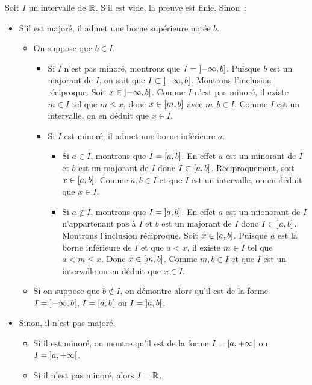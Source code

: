 \documentclass{magnoliaold}
\begin{document}
\begin{preuve}
Soit $I$ un intervalle de $\mathbb{R}$. S'il est vide, la preuve est finie. Sinon~:
\begin{itemize}
\item S'il est majoré, il admet une borne supérieure notée $b$.
  \begin{itemize}
  \item On suppose que $b\in I$.
    \begin{itemize}
    \item Si $I$ n'est pas minoré, montrons que $I=\left]-\infty,b\right]$.
      Puisque $b$ est un majorant de $I$, on sait que
      $I\subset\left]-\infty,b\right]$. Montrons l'inclusion réciproque. Soit
      $x\in\left]-\infty,b\right]$. Comme $I$ n'est pas minoré, il existe
      $m\in I$ tel que $m\leq x$, donc $x\in\left[m,b\right]$ avec $m,b\in I$.
      Comme $I$ est un intervalle, on en déduit que $x\in I$.
    \item Si $I$ est minoré, il admet une borne inférieure $a$.
      \begin{itemize}
      \item Si $a\in I$, montrons que $I=\left[a,b\right]$. En effet $a$ est un
        minorant de $I$ et $b$ est un majorant de $I$ donc
        $I\subset\left[a,b\right]$. Réciproquement, soit $x\in\left[a,b\right]$.
        Comme $a,b\in I$ et que $I$ est un intervalle, on en déduit que
        $x\in I$.
      \item Si $a\not\in I$, montrons que $I=\left]a,b\right]$. En effet $a$
        est un mionorant de $I$ n'appartenant pas à $I$ et $b$ est un majorant
        de $I$ donc $I\subset\left]a,b\right]$. Montrons l'inclusion réciproque.
        Soit $x\in\left]a,b\right]$. Puisque $a$ est la borne inférieure de $I$
        et que $a<x$, il existe $m\in I$ tel que $a<m\leq x$. Donc
        $x\in\left[m,b\right]$. Comme $m,b\in I$ et que $I$ est un intervalle
        on en déduit que $x\in I$.
      \end{itemize}
    \end{itemize}
  \item Si on suppose que $b\not\in I$, on démontre alors qu'il est de la forme
    $I=\left]-\infty,b\right[$, $I=\left[a,b\right[$ ou $I=\left]a,b\right[$.
  \end{itemize}
\item Sinon, il n'est pas majoré.
  \begin{itemize}
  \item Si il est minoré, on montre qu'il est de la forme
    $I=\left[a,+\infty\right[$ ou $I=\left]a,+\infty\right[$.
  \item Si il n'est pas minoré, alors $I=\mathbb{R}$.
  \end{itemize}
\end{itemize}
\end{preuve}
\end{document}
